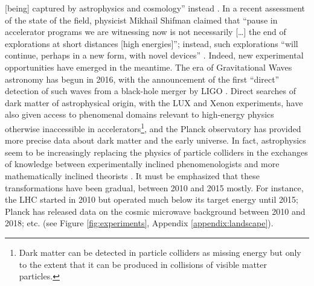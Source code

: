 \documentclass{article}
\begin{document}
[being] captured by astrophysics and cosmology'' instead \citep{Kosyakov2023}. In a recent assessment of the state of the field, physicist Mikhail Shifman claimed that ``pause in accelerator programs we are witnessing now is not necessarily [\dots] the end of explorations at short distances [high energies]''; instead, such explorations ``will continue, perhaps in a new form, with novel devices'' \citep{Shifman2020}. Indeed, new experimental opportunities have emerged in the meantime. The era of Gravitational Waves astronomy has begun in 2016, with the announcement of the first ``direct'' detection of such waves from a black-hole merger by LIGO \citep{Abbott2016}. Direct searches of dark matter of astrophysical origin, with the LUX and Xenon experiments, have also given access to phenomenal domains relevant to high-energy physics otherwise inaccessible in accelerators\footnote{Dark matter can be detected in particle colliders as missing energy but only to the extent that it can be produced in collisions of visible matter particles.}, and the Planck observatory \citep{planck2011planck} has provided more precise data about dark matter and the early universe. %
In fact, astrophysics seem to be increasingly replacing the physics of particle colliders in the exchanges of knowledge between experimentally inclined phenomenologists and more mathematically inclined theorists \citep{Gautheron2023}. It must be emphasized that these transformations have been gradual, between 2010 and 2015 mostly. For instance, the LHC started in 2010 but operated much below its target energy until 2015; Planck has released data on the cosmic microwave background between 2010 and 2018; etc. (see Figure \ref{fig:experiments}, Appendix \ref{appendix:landscape}).
\end{document}
